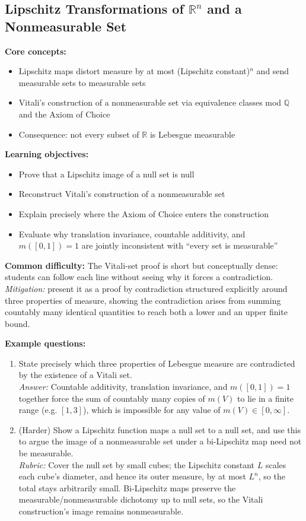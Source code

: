 \documentclass[11pt]{article}
\begin{document}
\subsection{Lipschitz Transformations of $\mathbb{R}^n$ and a Nonmeasurable Set}

\textbf{Core concepts:}
\begin{itemize}[nosep]
\item Lipschitz maps distort measure by at most (Lipschitz constant)$^n$ and send measurable sets to measurable sets
\item Vitali's construction of a nonmeasurable set via equivalence classes mod $\mathbb{Q}$ and the Axiom of Choice
\item Consequence: not every subset of $\mathbb{R}$ is Lebesgue measurable
\end{itemize}

\textbf{Learning objectives:}
\begin{itemize}[nosep]
\item Prove that a Lipschitz image of a null set is null
\item Reconstruct Vitali's construction of a nonmeasurable set
\item Explain precisely where the Axiom of Choice enters the construction
\item Evaluate why translation invariance, countable additivity, and $m([0,1])=1$ are jointly inconsistent with ``every set is measurable''
\end{itemize}

\textbf{Common difficulty:} The Vitali-set proof is short but conceptually dense: students can follow each line without seeing why it forces a contradiction. \textit{Mitigation:} present it as a proof by contradiction structured explicitly around three properties of measure, showing the contradiction arises from summing countably many identical quantities to reach both a lower and an upper finite bound.

\textbf{Example questions:}
\begin{enumerate}[nosep]
\item State precisely which three properties of Lebesgue measure are contradicted by the existence of a Vitali set. \\
\textit{Answer:} Countable additivity, translation invariance, and $m([0,1])=1$ together force the sum of countably many copies of $m(V)$ to lie in a finite range (e.g. $[1,3]$), which is impossible for any value of $m(V)\in[0,\infty]$.
\item (Harder) Show a Lipschitz function maps a null set to a null set, and use this to argue the image of a nonmeasurable set under a bi-Lipschitz map need not be measurable. \\
\textit{Rubric:} Cover the null set by small cubes; the Lipschitz constant $L$ scales each cube's diameter, and hence its outer measure, by at most $L^n$, so the total stays arbitrarily small. Bi-Lipschitz maps preserve the measurable/nonmeasurable dichotomy up to null sets, so the Vitali construction's image remains nonmeasurable.
\end{enumerate}
\end{document}

